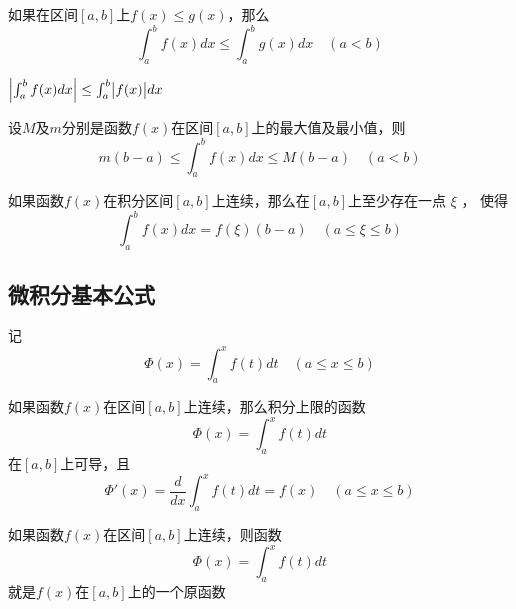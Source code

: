 \documentclass[11pt]{article}
\begin{document}
\begin{corollary}[]
如果在区间\([a,b]\)上\(f(x)\le g(x)\)，那么
\begin{equation*}
\int_a^bf(x)dx\le\int_a^bg(x)dx\quad(a<b)
\end{equation*}
\end{corollary}

\begin{corollary}[]
\(\abs{\int_a^bf(x)dx}\le\int_a^b\abs{f(x)}dx\)
\end{corollary}

\begin{proposition}[]
设\(M\)及\(m\)分别是函数\(f(x)\)在区间\([a,b]\)上的最大值及最小值，则
\begin{equation*}
m(b-a)\le\int_a^bf(x)dx\le M(b-a)\quad(a<b)
\end{equation*}
\end{proposition}

\begin{theorem}[定积分中值定理]
如果函数\(f(x)\)在积分区间\([a,b]\)上连续，那么在\([a,b]\)上至少存在一点 \(\xi\) ，
使得
\begin{equation*}
\int_a^bf(x)dx=f(\xi)(b-a)\quad(a\le\xi\le b)
\end{equation*}
\end{theorem}
\subsection{微积分基本公式}
\label{sec:org94bcd2b}
记
\begin{equation*}
\Phi(x)=\int^x_af(t)dt\quad(a\le x\le b)
\end{equation*}

\begin{theorem}[]
如果函数\(f(x)\)在区间\([a,b]\)上连续，那么积分上限的函数
\begin{equation*}
\Phi(x)=\int_a^xf(t)dt
\end{equation*}
在\([a,b]\)上可导，且
\begin{equation*}
\Phi'(x)=\frac{d}{dx}\int_a^xf(t)dt=f(x)\quad(a\le x\le b)
\end{equation*}
\end{theorem}

\begin{theorem}[]
如果函数\(f(x)\)在区间\([a,b]\)上连续，则函数
\begin{equation*}
\Phi(x)=\int_a^xf(t)dt
\end{equation*}
就是\(f(x)\)在\([a,b]\)上的一个原函数
\end{theorem}
\end{document}
